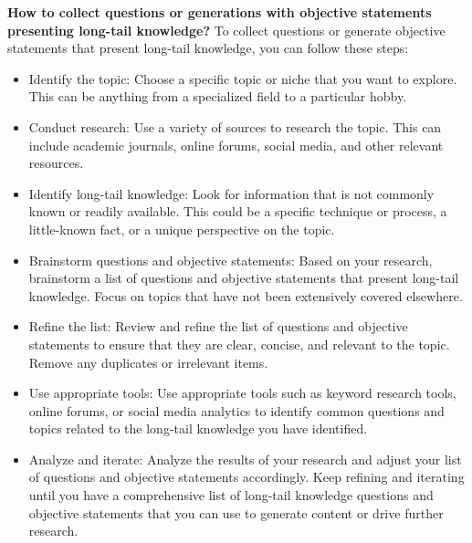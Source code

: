 \textbf{How to collect questions or generations with objective statements presenting long-tail knowledge?}
To collect questions or generate objective statements that present long-tail knowledge, you can follow these steps:
\begin{itemize}
    \item Identify the topic: Choose a specific topic or niche that you want to explore. This can be anything from a specialized field to a particular hobby.

    \item Conduct research: Use a variety of sources to research the topic. This can include academic journals, online forums, social media, and other relevant resources.
    
    \item Identify long-tail knowledge: Look for information that is not commonly known or readily available. This could be a specific technique or process, a little-known fact, or a unique perspective on the topic.
    
    \item Brainstorm questions and objective statements: Based on your research, brainstorm a list of questions and objective statements that present long-tail knowledge. Focus on topics that have not been extensively covered elsewhere.
    
    \item Refine the list: Review and refine the list of questions and objective statements to ensure that they are clear, concise, and relevant to the topic. Remove any duplicates or irrelevant items.
    
    \item Use appropriate tools: Use appropriate tools such as keyword research tools, online forums, or social media analytics to identify common questions and topics related to the long-tail knowledge you have identified.
    
    \item Analyze and iterate: Analyze the results of your research and adjust your list of questions and objective statements accordingly. Keep refining and iterating until you have a comprehensive list of long-tail knowledge questions and objective statements that you can use to generate content or drive further research.
\end{itemize}

